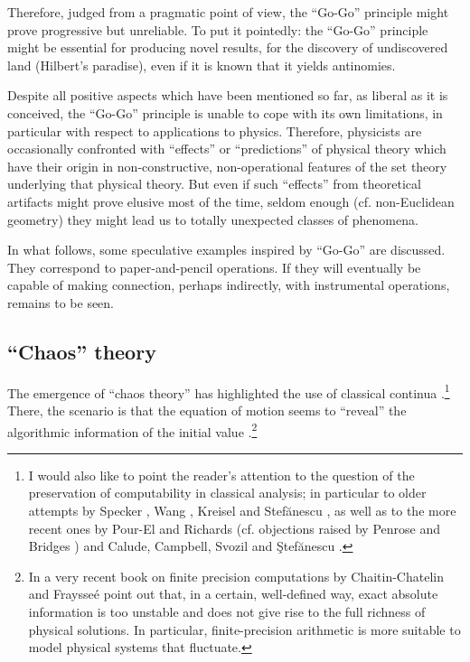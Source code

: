 Therefore, judged from a pragmatic point of view, the ``Go-Go''
principle might prove progressive but unreliable.
To put it pointedly: the ``Go-Go'' principle might be essential for
producing novel results, for the discovery of undiscovered land
(Hilbert's paradise),
even if it is
known that it yields antinomies.

Despite all positive aspects which have been mentioned so far, as
liberal as it is conceived, the
``Go-Go'' principle is unable to cope with its own limitations, in
particular with respect to applications to physics.
Therefore, physicists are occasionally confronted with ``effects'' or
``predictions'' of physical theory which have their origin in
non-constructive, non-operational features of the set theory underlying
that physical theory.
But even if
such ``effects'' from theoretical artifacts might prove elusive most of
the time, seldom enough (cf. non-Euclidean geometry) they might lead us
to totally unexpected classes of phenomena.

In what follows, some speculative examples inspired
by
``Go-Go'' are discussed.
They correspond to paper-and-pencil operations.
If they will eventually be capable of making connection, perhaps
indirectly, with instrumental operations, remains to be seen.


\subsection{``Chaos'' theory}
The emergence of ``chaos
theory'' has highlighted the use of classical continua
\cite{calude-sv}.\footnote{
I would also like to point the reader's attention to the question of the
preservation of computability in classical analysis; in particular
 to older attempts by Specker \cite{specker}, Wang \cite{wang},
Kreisel
\cite{kreisel}
and    Stef\u anescu  \cite{ds},
as well as to the more recent
ones by Pour-El and Richards \cite{pour-el}
(cf. objections raised by Penrose \cite{penrose} and Bridges
\cite{bridges1})
and
Calude,
Campbell,
Svozil and
 \c{S}tef\u anescu \cite{calude-sv}.}
There, the scenario is that the equation of motion
seems to ``reveal'' the algorithmic information
\cite{chaitin,calude,vitani} of the initial value
\cite{shaw,smale,ford}.\footnote{
In a very recent book on finite precision computations by
Chaitin-Chatelin and  Fraysse\'{e} \cite{chaitin-chatelin}
point out that, in a certain, well-defined way, exact absolute
information is too unstable and does not give rise to the full richness
of physical solutions. In particular, finite-precision arithmetic is
more suitable to model physical systems that fluctuate.}


